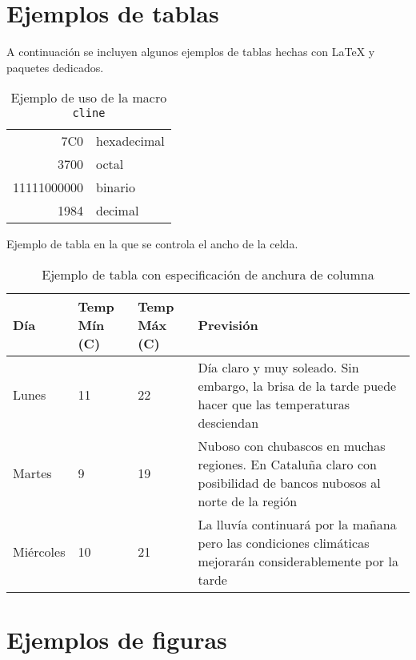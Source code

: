 \newpage


\section{Ejemplos de tablas}
\label{sec:ejTablas}
A continuación se incluyen algunos ejemplos de tablas hechas con \LaTeX{} y paquetes dedicados.

\begin{table}[htb]%
	\centering
	\caption{Ejemplo de uso de la macro \texttt{cline}}
	\label{tab:cline}
	\begin{tabular}[t]{|r|l|}
		\hline
		7C0 & hexadecimal \\[1cm] %
		3700 & octal \\ \cline{2-2}
		11111000000 & binario \\
		\hline \hline
		1984 & decimal \\
		\hline
	\end{tabular}
\end{table}


\noindent Ejemplo de tabla en la que se controla el ancho de la celda.

\begin{table}[htb]%
	\centering
	\caption{Ejemplo de tabla con especificación de anchura de columna}
	\label{tab:anchura}
	\begin{tabular}{ | l | l | l | p{5cm} |}
		\hline
		Día & Temp Mín (\textdegree C) & Temp Máx (\textdegree C) & Previsión \\ \hline
		Lunes & 11 & 22 & Día claro y muy soleado. Sin embargo, la brisa de la tarde puede hacer que las temperaturas desciendan \\ \hline
		Martes & 9 & 19 & Nuboso con chubascos en muchas regiones. En Cataluña claro con posibilidad de bancos nubosos al norte de la región \\ \hline
		Miércoles & 10 & 21 & La lluvía continuará por la mañana pero las condiciones climáticas mejorarán considerablemente por la tarde\\
		\hline
	\end{tabular}
\end{table}

\clearpage


\section{Ejemplos de figuras}
\label{sec:ejFiguras}

